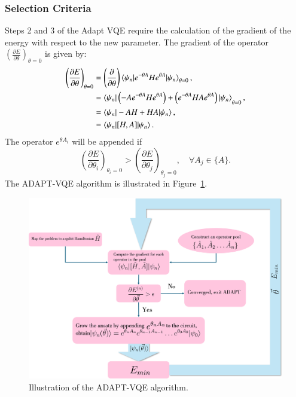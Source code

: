 \subsubsection{Selection Criteria}%
\label{ssub:selectioncriteria}
Steps 2 and 3 of the Adapt VQE require the calculation of the gradient of the energy with respect to the new parameter.
The gradient of the operator $ \left(\frac{\partial E}{\partial \theta}\right)_{\theta = 0} $ is given by:
\begin{align}
	\label{eq:A-gradient}
	\left( \frac{\partial E}{\partial \theta} \right)_{\theta = 0} &= \left( \frac{\partial }{\partial \theta} \right) \braket{\psi_n|e^{-\theta A}H e^{\theta A}|\psi_n}_{\theta = 0}, \\
	&= \braket{\psi_n|\left( -A e^{-\theta A} H e^{\theta A}\right)  + \left( e^{-\theta A}HAe^{\theta A} \right)|\psi_n }_{\theta=0}, \\
	&= \braket{\psi_n|-AH + HA|\psi_n}, \\
	&= \braket{\psi_n|[H,A]|\psi_n}.
\end{align}
The operator $ e^{\theta A_i} $ will be appended if 
\begin{equation}
	\label{eq:selection-criteria}
	\left( \frac{\partial E}{\partial \theta_i}\right)_{\theta_i = 0} > \left( \frac{\partial E}{\partial \theta_j} \right)_{\theta_j = 0}, \quad \forall A_j \in \{A\}. 
\end{equation}
The ADAPT-VQE algorithm is illustrated in Figure~\ref{fig:adapt-illu}.

\begin{figure}[ht]
    \centering
    \includegraphics[width=0.8\linewidth]{image/adapt-illu.png}
    \caption{Illustration of the ADAPT-VQE algorithm.}
    \label{fig:adapt-illu}
\end{figure}



